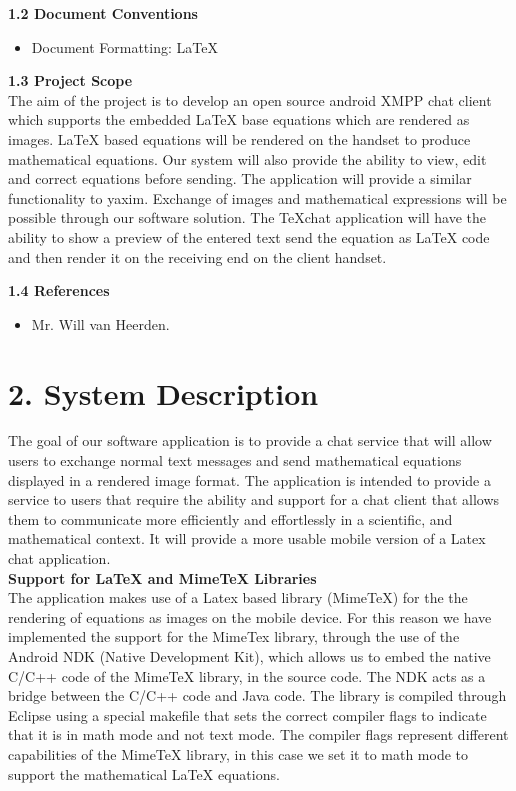 \documentclass[29pt,a4paper]{moderncv}
\begin{document}
		\noindent \textbf{1.2 Document Conventions}
			\begin{itemize}
				\item Document Formatting: LaTeX
			\end{itemize}
		\vspace{5mm}
		
		\noindent \textbf{1.3 Project Scope}
			\\The aim of the project is to develop an open source android XMPP chat client which supports the embedded LaTeX base equations which are rendered as images. LaTeX based equations will be rendered on the handset to produce mathematical equations. Our system will also provide the ability to view, edit and correct equations before sending.
			\parindent 5mm The application will provide a similar functionality to yaxim. Exchange of images and mathematical expressions will be possible through our software solution. The TeXchat application will have the ability to show a preview of the entered text send the equation as LaTeX code and then render it on the receiving end on the client handset.
		\vspace{5mm}
		
	\noindent \textbf{1.4 References}
		\begin{itemize}
		\item Mr. Will van Heerden.
		\end{itemize}
		\vspace{5mm}
		
\newpage
	\section*{\textbf{2. System Description}}
	\vspace{4mm}
	The goal of our software application is to provide a chat service that will allow users to exchange normal text messages and send mathematical equations displayed in a rendered image format.  The application is intended to provide a service to users that require the ability and support for a chat client that allows them to communicate more efficiently and effortlessly in a scientific, and mathematical context. It will provide a more usable mobile version of a Latex chat application.\\ 
			
			\noindent\textbf{Support for LaTeX and MimeTeX Libraries} \\
			\parindent 5mm The application makes use of a Latex based library (MimeTeX) for the the rendering of equations as images on the mobile device.  For this reason we have implemented the support for the MimeTex library, through the use of the Android NDK (Native Development Kit), which allows us to embed the native C/C++ code of the MimeTeX library, in the source code. 
			\parindent 5mm The NDK acts as a bridge between the C/C++ code and Java code. The library is compiled through Eclipse using a special makefile that sets the correct compiler flags to indicate that it is in math mode and not text mode. The compiler flags represent different capabilities of the MimeTeX library, in this case we set it to math mode to support the mathematical LaTeX equations.\\
			
\end{document}
